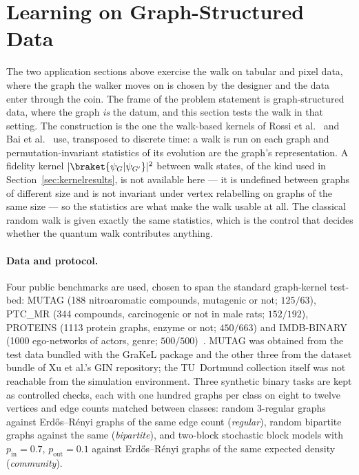 \section{Learning on Graph-Structured Data}
\label{sec:graphresults}

The two application sections above exercise the walk on tabular and pixel
data, where the graph the walker moves on is chosen by the designer and the
data enter through the coin. The frame of the problem statement is
graph-structured data, where the graph \emph{is} the datum, and this section
tests the walk in that setting. The construction is the one the walk-based
kernels of Rossi et al.~\cite{Rossi_2013} and Bai et al.~\cite{Bai_2015}
use, transposed to discrete time: a walk is run on each graph and
permutation-invariant statistics of its evolution are the graph's
representation. A fidelity kernel $|\braket{\psi_G|\psi_{G'}}|^2$ between walk
states, of the kind used in Section~\ref{sec:kernelresults}, is not available
here --- it is undefined between graphs of different size and is not
invariant under vertex relabelling on graphs of the same size --- so the
statistics are what make the walk usable at all. The classical random walk is
given exactly the same statistics, which is the control that decides whether
the quantum walk contributes anything.

\paragraph*{Data and protocol.}
Four public benchmarks are used, chosen to span the standard graph-kernel
test-bed: MUTAG (188 nitroaromatic compounds, mutagenic or not; $125/63$),
PTC\_MR (344 compounds, carcinogenic or not in male rats; $152/192$),
PROTEINS (1113 protein graphs, enzyme or not; $450/663$) and IMDB-BINARY
(1000 ego-networks of actors, genre; $500/500$)~\cite{Shervashidze_2011,
Xu_2019}. MUTAG was obtained from the test data bundled with the GraKeL
package and the other three from the dataset bundle of Xu et al.'s GIN
repository; the TU~Dortmund collection itself was not reachable from the
simulation environment. Three synthetic binary tasks are kept as controlled
checks, each with one hundred graphs per class on eight to twelve vertices and
edge counts matched between classes: random $3$-regular graphs against
Erd\H{o}s--R\'enyi graphs of the same edge count (\emph{regular}), random
bipartite graphs against the same (\emph{bipartite}), and two-block
stochastic block models with $p_{\mathrm{in}} = 0.7$, $p_{\mathrm{out}} =
0.1$ against Erd\H{o}s--R\'enyi graphs of the same expected density
(\emph{community}).


